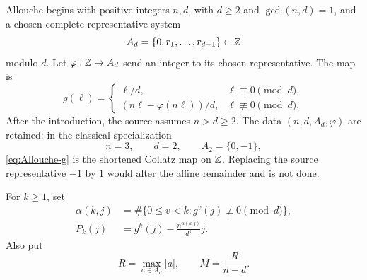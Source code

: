 Allouche begins with positive integers \(n,d\), with \(d\ge2\) and
\(\gcd(n,d)=1\), and a chosen complete representative system
\begin{equation}
\label{eq:Allouche-Ad}
 A_d=\{0,r_1,\ldots,r_{d-1}\}\subset\mathbb{Z}
\end{equation}
modulo \(d\).  Let \(\varphi:\mathbb{Z}\to A_d\) send an integer to its chosen
representative.  The map is
\begin{equation}
\label{eq:Allouche-g}
 g(\ell)=
 \begin{cases}
  \ell/d,&\ell\equiv0\pmod d,\\[1mm]
  (n\ell-\varphi(n\ell))/d,&\ell\not\equiv0\pmod d.
 \end{cases}
\end{equation}
After the introduction, the source assumes \(n>d\ge2\).  The data
\((n,d,A_d,\varphi)\) are retained: in the classical specialization
\[
 n=3,\qquad d=2,\qquad A_2=\{0,-1\},
\]
\eqref{eq:Allouche-g} is the shortened Collatz map on \(\mathbb{Z}\).  Replacing the
source representative \(-1\) by \(1\) would alter the affine remainder and
is not done.

For \(k\ge1\), set
\begin{align}
 \alpha(k,j)
  &=\#\{0\le v<k:g^v(j)\not\equiv0\pmod d\},              \label{eq:Allouche-alpha}\\
 P_k(j)
  &=g^k(j)-\frac{n^{\alpha(k,j)}}{d^k}j.                 \label{eq:Allouche-P}
\end{align}
Also put
\begin{equation}
\label{eq:Allouche-M}
 R=\max_{a\in A_d}|a|,
 \qquad
 M=\frac{R}{n-d}.
\end{equation}

